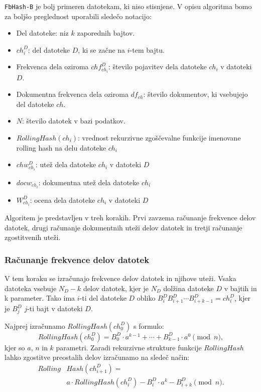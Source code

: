 \documentclass{acm_proc_article-sp}
\begin{document}
\texttt{FbHash-B} je bolj primeren datotekam, ki niso stisnjene. V opisu algoritma bomo za boljšo preglednost uporabili sledečo notacijo:
\begin{itemize}
  \item Del datoteke: niz $k$ zaporednih bajtov. 
  \item $ch_{i}^D$: del datoteke $D$, ki se začne na $i$-tem bajtu.
  \item Frekvenca dela oziroma $chf_{ch_i}^D$: število pojavitev dela datoteke $ch_i$ v datoteki $D$.
  \item Dokumentna frekvenca dela oziroma $df_{ch}$: število dokumentov, ki vsebujejo del datoteke $ch$.
  \item $N$: število datotek v bazi podatkov.
  \item $RollingHash(ch_i)$: vrednost rekurzivne zgoščevalne funkcije imenovane rolling hash na delu datoteke $ch_i$
  \item $chw_{ch_i}^D$: utež dela datoteke $ch_i$ v datoteki $D$
  \item $docw_{ch_i}$: dokumentna utež dela datoteke $ch_i$
  \item $W_{ch_i}^D$: ocena dela datoteke $ch_i$ v datoteki $D$
\end{itemize}

Algoritem je predstavljen v treh korakih. Prvi zavzema računanje frekvence delov datotek, drugi računanje dokumentnih uteži delov datotek in tretji računanje zgostitvenih uteži.

\subsubsection{Računanje frekvence delov datotek}

V tem koraku se izračunajo frekvence delov datotek in njihove uteži. Vsaka datoteka vsebuje $N_D - k$ delov datotek, kjer je $N_D$ dolžina datoteke $D$ v bajtih in k parameter. Tako ima $i$-ti del datoteke $D$ obliko $B_{i}^{D}B_{i+1}^{D} \cdots B_{i+k-1}^{D} = ch_{i}^D$, kjer je $B_{j}^{D}$ $j$-ti bajt v datoteki $D$.

Najprej izračunamo $RollingHash(ch_{0}^D)$ s formulo: 
\[RollingHash(ch_{0}^D) = B_{0}^{D} \cdot a^{k-1} + \cdots + B_{k-1}^{D} \cdot a^0 \pmod n,\]
kjer so $a$, $n$ in $k$ parametri. Zaradi rekurzivne strukture funkcije $RollingHash$ lahko zgostitve preostalih delov izračunamo na sledeč način:
\begin{align*}
Rolling&Hash(ch_{i+1}^D) = \\
&a \cdot RollingHash(ch_{i}^D)-B_{i}^{D} \cdot a^{k}-B_{i+k}^D \pmod n.
\end{align*}
\end{document}
